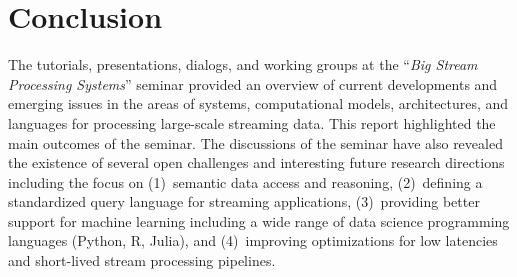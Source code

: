 \section{Conclusion}\label{sec:conclusion}
The tutorials, presentations, dialogs, and working groups at the ``\emph{Big Stream
  Processing Systems}'' seminar provided an overview of current developments and emerging issues in the areas of systems,
computational models, architectures, and languages for processing large-scale streaming data.
This report highlighted the main outcomes of the seminar. The discussions of the seminar have also revealed the existence of several open challenges and interesting future research directions including the focus on (1)~semantic data access and reasoning, (2)~defining a standardized query language for streaming applications, (3)~providing better support for machine learning including a wide range of data science programming languages (Python, R, Julia), and (4)~improving optimizations for low latencies and short-lived stream processing pipelines.
